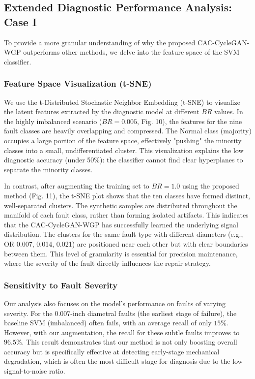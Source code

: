 \subsection{Extended Diagnostic Performance Analysis: Case I}
To provide a more granular understanding of why the proposed CAC-CycleGAN-WGP outperforms other methods, we delve into the feature space of the SVM classifier.

\subsubsection{Feature Space Visualization (t-SNE)}
We use the t-Distributed Stochastic Neighbor Embedding (t-SNE) to visualize the latent features extracted by the diagnostic model at different $BR$ values. In the highly imbalanced scenario ($BR=0.005$, Fig. 10), the features for the nine fault classes are heavily overlapping and compressed. The Normal class (majority) occupies a large portion of the feature space, effectively "pushing" the minority classes into a small, undifferentiated cluster. This visualization explains the low diagnostic accuracy (under 50\%): the classifier cannot find clear hyperplanes to separate the minority classes.

In contrast, after augmenting the training set to $BR=1.0$ using the proposed method (Fig. 11), the t-SNE plot shows that the ten classes have formed distinct, well-separated clusters. The synthetic samples are distributed throughout the manifold of each fault class, rather than forming isolated artifacts. This indicates that the CAC-CycleGAN-WGP has successfully learned the underlying signal distribution. The clusters for the same fault type with different diameters (e.g., OR 0.007, 0.014, 0.021) are positioned near each other but with clear boundaries between them. This level of granularity is essential for precision maintenance, where the severity of the fault directly influences the repair strategy.

\subsubsection{Sensitivity to Fault Severity}
Our analysis also focuses on the model's performance on faults of varying severity. For the 0.007-inch diametral faults (the earliest stage of failure), the baseline SVM (imbalanced) often fails, with an average recall of only $15\%$. However, with our augmentation, the recall for these subtle faults improves to $96.5\%$. This result demonstrates that our method is not only boosting overall accuracy but is specifically effective at detecting early-stage mechanical degradation, which is often the most difficult stage for diagnosis due to the low signal-to-noise ratio.

